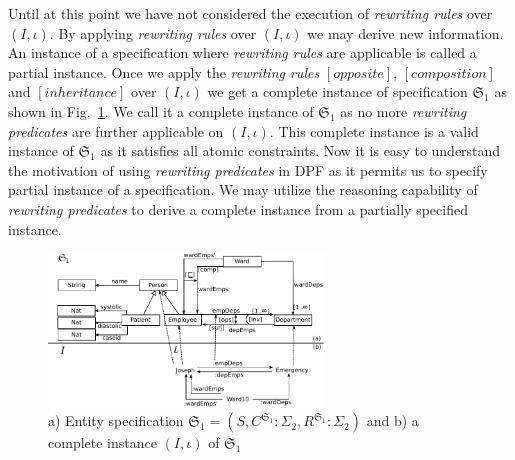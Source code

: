 \documentclass{eceasst}
\begin{document}
Until at this point we have not considered the execution of \textit{rewriting rules} over $(I, \iota)$. 
By applying \textit{rewriting rules} over $(I, \iota)$ we may derive new information. 
An instance of a specification where \textit{rewriting rules} are applicable is called a partial instance. 
Once we apply the \textit{rewriting rules} $[opposite]$, $[composition]$ and $[inheritance]$ over $(I, \iota)$ we get a complete instance of specification $\mathfrak{S}_1$ as shown in 
Fig.~\ref{fig:entity-1-full}. We call it a complete instance of $\mathfrak{S}_1$ as no more \textit{rewriting predicates} are further applicable on $(I, \iota)$. 
This complete instance is a valid instance of $\mathfrak{S}_1$ as it satisfies all atomic constraints. 
Now it is easy to understand the motivation of using \textit{rewriting predicates} in DPF as it permits us to specify partial instance of a specification. 
We may utilize the reasoning capability of \textit{rewriting predicates} to derive a complete instance from a partially specified instance. 



\begin{figure}[h]
\centering
 \includegraphics[width=0.65\textwidth]{entity-1-full.pdf}
 \caption{ a) Entity specification $\mathfrak{S}_1 = (S, C^{\mathfrak{S}_1} : \Sigma_2,  R^{\mathfrak{S}_1} : \Sigma_2)$ and  b) a complete instance $(I, \iota)$ of $\mathfrak{S}_1$}
 \label{fig:entity-1-full}
 \end{figure}
\end{document}
